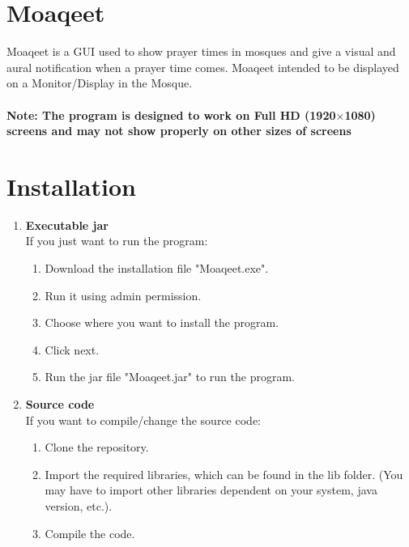 \documentclass[12pt,a4paper]{article}
\begin{document}
\section*{Moaqeet}
Moaqeet is a GUI used to show prayer times in mosques and give a visual and aural notification when a prayer time comes. Moaqeet intended to be displayed on a Monitor/Display in the Mosque.\\\\
 \textbf{Note: The program is designed to work on Full HD (1920$\times$1080) screens and may not show properly on other sizes of screens}

\section*{Installation}
\begin{enumerate}
\item \textbf{Executable jar}\\
If you just want to run the program:
\begin{enumerate}
\item Download the installation file "Moaqeet.exe". 
\item Run it using admin permission. 
\item Choose where you want to install the program.
\item Click next.
\item Run the jar file "Moaqeet.jar" to run the program.
\end{enumerate}
\item \textbf{Source code}\\
If you want to compile/change the source code:
\begin{enumerate}
\item Clone the repository. 
\item Import the required libraries, which can be found in the lib folder. (You may have to import other libraries dependent on your system, java version, etc.).
\item Compile the code.
\end{enumerate}
\end{enumerate}
\end{document}
